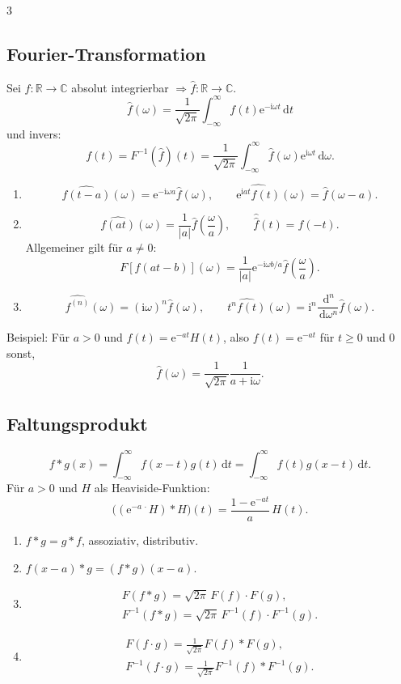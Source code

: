 \documentclass[a4paper,landscape]{article}
\newcommand{\C}{\mathbb C}
\newcommand{\R}{\mathbb R}
\newcommand{\dd}{\,\mathrm d}
\newcommand{\ee}{\mathrm e}
\newcommand{\ii}{\mathrm i}
\begin{document}
\begin{multicols*}{3}
\subsection*{Fourier-Transformation}
Sei $f:\R\to\C$ absolut integrierbar $\Rightarrow \hat f:\R\to\C$.
\[
\hat f(\omega)=\frac1{\sqrt{2\pi}}\int_{-\infty}^{\infty}f(t)\ee^{-\ii\omega t}\dd t
\]
und invers:
\[
f(t)=F^{-1}(\hat f)(t)=\frac1{\sqrt{2\pi}}\int_{-\infty}^{\infty}\hat f(\omega)\ee^{\ii\omega t}\dd\omega.
\]
\begin{enumerate}[label=(\roman*)]
\item
\[
\widehat{f(t-a)}(\omega)=\ee^{-\ii\omega a}\hat f(\omega),
\qquad \widehat{\ee^{\ii at}f(t)}(\omega)=\hat f(\omega-a).
\]
\item
\[
\widehat{f(at)}(\omega)=\frac1{|a|}\hat f\left(\frac{\omega}{a}\right),
\qquad \widehat{\hat f}(t)=f(-t).
\]
Allgemeiner gilt für $a\ne0$:
\[
F[f(at-b)](\omega)=\frac1{|a|}\ee^{-\ii\omega b/a}\hat f\left(\frac{\omega}{a}\right).
\]
\item
\[
\widehat{f^{(n)}}(\omega)=(\ii\omega)^n\hat f(\omega),
\qquad \widehat{t^n f(t)}(\omega)=\ii^n\frac{\dd^n}{\dd\omega^n}\hat f(\omega).
\]
\end{enumerate}
Beispiel: Für $a>0$ und $f(t)=\ee^{-at}H(t)$, also $f(t)=\ee^{-at}$ für $t\ge0$ und $0$ sonst,
\[
\hat f(\omega)=\frac1{\sqrt{2\pi}}\frac{1}{a+\ii\omega}.
\]

\subsection*{Faltungsprodukt}
\[
f*g(x)=\int_{-\infty}^{\infty}f(x-t)g(t)\dd t
=\int_{-\infty}^{\infty}f(t)g(x-t)\dd t.
\]
Für $a>0$ und $H$ als Heaviside-Funktion:
\[
\bigl((\ee^{-a\,\cdot}H)*H\bigr)(t)=\frac{1-\ee^{-at}}{a}\,H(t).
\]
\begin{enumerate}[label=(\roman*)]
\item $f*g=g*f$, assoziativ, distributiv.
\item $f(x-a)*g=(f*g)(x-a)$.
\item
\[
\begin{gathered}
F(f*g)=\sqrt{2\pi}\,F(f)\cdot F(g),\\
F^{-1}(f*g)=\sqrt{2\pi}\,F^{-1}(f)\cdot F^{-1}(g).
\end{gathered}
\]
\item
\[
\begin{gathered}
F(f\cdot g)=\frac1{\sqrt{2\pi}}F(f)*F(g),\\
F^{-1}(f\cdot g)=\frac1{\sqrt{2\pi}}F^{-1}(f)*F^{-1}(g).
\end{gathered}
\]
\end{enumerate}


\end{multicols*}
\end{document}
